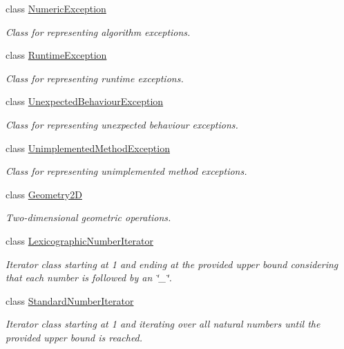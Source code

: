\begin{DoxyCompactItemize}
class \hyperlink{classmultiscale_1_1NumericException}{Numeric\-Exception}
\begin{DoxyCompactList}\small\item\em Class for representing algorithm exceptions. \end{DoxyCompactList}\item 
class \hyperlink{classmultiscale_1_1RuntimeException}{Runtime\-Exception}
\begin{DoxyCompactList}\small\item\em Class for representing runtime exceptions. \end{DoxyCompactList}\item 
class \hyperlink{classmultiscale_1_1UnexpectedBehaviourException}{Unexpected\-Behaviour\-Exception}
\begin{DoxyCompactList}\small\item\em Class for representing unexpected behaviour exceptions. \end{DoxyCompactList}\item 
class \hyperlink{classmultiscale_1_1UnimplementedMethodException}{Unimplemented\-Method\-Exception}
\begin{DoxyCompactList}\small\item\em Class for representing unimplemented method exceptions. \end{DoxyCompactList}\item 
class \hyperlink{classmultiscale_1_1Geometry2D}{Geometry2\-D}
\begin{DoxyCompactList}\small\item\em Two-\/dimensional geometric operations. \end{DoxyCompactList}\item 
class \hyperlink{classmultiscale_1_1LexicographicNumberIterator}{Lexicographic\-Number\-Iterator}
\begin{DoxyCompactList}\small\item\em Iterator class starting at 1 and ending at the provided upper bound considering that each number is followed by an \char`\"{}\-\_\-\char`\"{}. \end{DoxyCompactList}\item 
class \hyperlink{classmultiscale_1_1StandardNumberIterator}{Standard\-Number\-Iterator}
\begin{DoxyCompactList}\small\item\em Iterator class starting at 1 and iterating over all natural numbers until the provided upper bound is reached. \end{DoxyCompactList}\item 

\end{DoxyCompactItemize}
